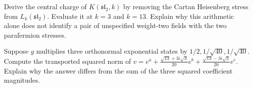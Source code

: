 \begin{exercise}\label{ex:voa-coset}
Derive the central charge of $K(\mathfrak{sl}_2,k)$ by removing
the Cartan Heisenberg stress from $L_k(\mathfrak{sl}_2)$.
Evaluate it at $k=3$ and $k=13$. Explain why this arithmetic alone
does not identify a pair of unspecified weight-two fields with the
two parafermion stresses.

\par\smallskip{}\par
\end{exercise}

\begin{exercise}\label{ex:voa-gauge}
Suppose $g$ multiplies three orthonormal exponential states by
$1/2,1/\sqrt{40},1/\sqrt{40}$. Compute the transported squared norm of
$v=e^a+\frac{\sqrt{13}+3i\sqrt3}{20}e^b+
\frac{\sqrt{13}-3i\sqrt3}{20}e^c$. Explain why the answer differs
from the sum of the three squared coefficient magnitudes.

\par\smallskip{}\par
\end{exercise}
